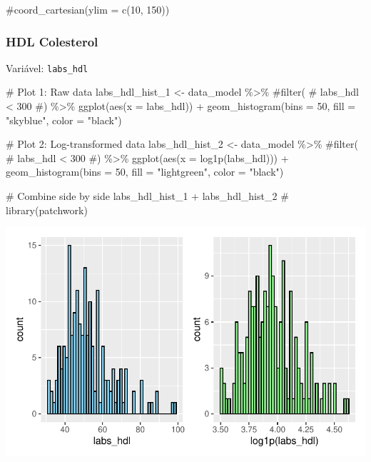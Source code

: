 \documentclass[
  12pt,
]{article}
\newenvironment{Shaded}{\begin{snugshade}}{\end{snugshade}}
\newcommand{\AttributeTok}[1]{\textcolor[rgb]{0.40,0.45,0.13}{#1}}
\newcommand{\CommentTok}[1]{\textcolor[rgb]{0.37,0.37,0.37}{#1}}
\newcommand{\DecValTok}[1]{\textcolor[rgb]{0.68,0.00,0.00}{#1}}
\newcommand{\FunctionTok}[1]{\textcolor[rgb]{0.28,0.35,0.67}{#1}}
\newcommand{\NormalTok}[1]{\textcolor[rgb]{0.00,0.23,0.31}{#1}}
\newcommand{\OtherTok}[1]{\textcolor[rgb]{0.00,0.23,0.31}{#1}}
\newcommand{\SpecialCharTok}[1]{\textcolor[rgb]{0.37,0.37,0.37}{#1}}
\newcommand{\StringTok}[1]{\textcolor[rgb]{0.13,0.47,0.30}{#1}}
\begin{document}
\begin{Shaded}
\begin{Highlighting}[]
    \CommentTok{\#coord\_cartesian(ylim = c(10, 150))}
\end{Highlighting}
\end{Shaded}

\subsubsection{HDL Colesterol}\label{hdl-colesterol}

Variável: \texttt{labs\_hdl}

\begin{Shaded}
\begin{Highlighting}[]
\CommentTok{\# Plot 1: Raw data}
\NormalTok{labs\_hdl\_hist\_1 }\OtherTok{\textless{}{-}}\NormalTok{ data\_model }\SpecialCharTok{\%\textgreater{}\%} 
    \CommentTok{\#filter(}
    \CommentTok{\#    labs\_hdl \textless{} 300}
    \CommentTok{\#) \%\textgreater{}\% }
    \FunctionTok{ggplot}\NormalTok{(}\FunctionTok{aes}\NormalTok{(}\AttributeTok{x =}\NormalTok{ labs\_hdl)) }\SpecialCharTok{+} 
    \FunctionTok{geom\_histogram}\NormalTok{(}\AttributeTok{bins =} \DecValTok{50}\NormalTok{, }\AttributeTok{fill =} \StringTok{"skyblue"}\NormalTok{, }\AttributeTok{color =} \StringTok{"black"}\NormalTok{)}

\CommentTok{\# Plot 2: Log{-}transformed data}
\NormalTok{labs\_hdl\_hist\_2 }\OtherTok{\textless{}{-}}\NormalTok{ data\_model }\SpecialCharTok{\%\textgreater{}\%} 
    \CommentTok{\#filter(}
    \CommentTok{\#    labs\_hdl \textless{} 300}
    \CommentTok{\#) \%\textgreater{}\%}
    \FunctionTok{ggplot}\NormalTok{(}\FunctionTok{aes}\NormalTok{(}\AttributeTok{x =} \FunctionTok{log1p}\NormalTok{(labs\_hdl))) }\SpecialCharTok{+} 
    \FunctionTok{geom\_histogram}\NormalTok{(}\AttributeTok{bins =} \DecValTok{50}\NormalTok{, }\AttributeTok{fill =} \StringTok{"lightgreen"}\NormalTok{, }\AttributeTok{color =} \StringTok{"black"}\NormalTok{)}

\CommentTok{\# Combine side by side}
\NormalTok{labs\_hdl\_hist\_1 }\SpecialCharTok{+}\NormalTok{ labs\_hdl\_hist\_2 }\CommentTok{\# library(patchwork)}
\end{Highlighting}
\end{Shaded}

\includegraphics{Outcomes_files/figure-pdf/labs_hdl_1-1.pdf}
\end{document}
